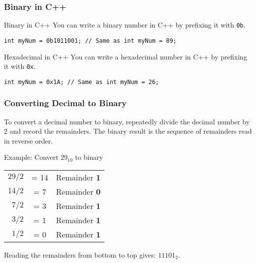 \documentclass{beamer}
\begin{document}
\begin{frame}
\frametitle{Binary in C++}
\begin{alertblock}{Binary in C++}
You can write a binary number in C++ by prefixing it with \texttt{0b}.
\end{alertblock}
\texttt{int myNum = 0b1011001; // Same as int myNum = 89;}

\begin{alertblock}{Hexadecimal in C++}
You can write a hexadecimal number in C++ by prefixing it with \texttt{0x}.
\end{alertblock}
\texttt{int myNum = 0x1A; // Same as int myNum = 26;}
\end{frame}

\begin{frame}
\frametitle{Converting Decimal to Binary}
To convert a decimal number to binary, repeatedly divide the decimal number by 2 and record the remainders. The binary result is the sequence of remainders read in \alert{reverse order}.

\begin{exampleblock}{Example: Convert $29_{10}$ to binary}
\begin{tabular}{r c l}
 $29 / 2$ & = 14 & Remainder \textbf{1} \\
 $14 / 2$ & = 7  & Remainder \textbf{0} \\
 $7 / 2$  & = 3  & Remainder \textbf{1} \\
 $3 / 2$  & = 1  & Remainder \textbf{1} \\
 $1 / 2$  & = 0  & Remainder \textbf{1} \\
\end{tabular}
\vfill
Reading the remainders from bottom to top gives: \alert{$11101_2$}.
\end{exampleblock}
\end{frame}
\end{document}
